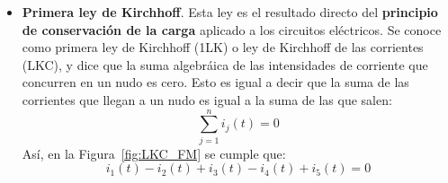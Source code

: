 	\begin{itemize}
        \item \textbf{Primera ley de Kirchhoff}. Esta ley es el
          resultado directo del \textbf{principio de conservación de
            la carga} aplicado a los circuitos eléctricos. Se conoce
          como primera ley de Kirchhoff (1LK) o ley de Kirchhoff de
          las corrientes (LKC), y dice que la suma algebráica de las
          intensidades de corriente que concurren en un nudo es
          cero. Esto es igual a decir que la suma de las corrientes
          que llegan a un nudo es igual a la suma de las que salen:
          \begin{equation}
            \boxed{\sum_{j=1}^n i_j(t)=0}
          \end{equation}
          Así, en la Figura~\ref{fig:LKC_FM} se cumple que:
          \begin{equation*}
            i_1(t) - i_2(t) + i_3(t) - i_4(t) + i_5(t) = 0
          \end{equation*}
		

\end{itemize}
